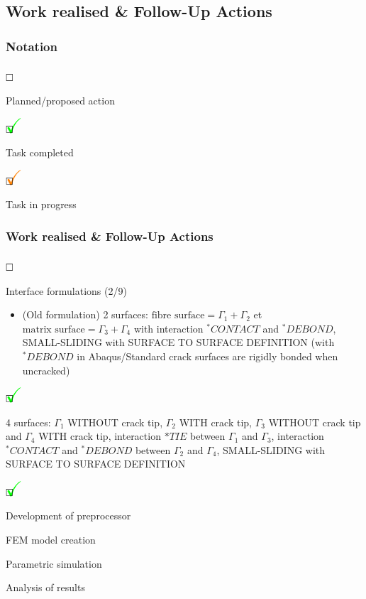 \documentclass[first,firstsupp,lastsupp,handout,last,hyperref,table]{ETHclass}
\begin{document}
\subsection{Work realised \& Follow-Up Actions}

\begin{frame}
\frametitle{Notation}
\vspace{-0.5cm}
\scriptsize
\begin{list}{$\text{\rlap{\textcolor{white}{\huge$\mathbf{\checkmark}$}}}\square$}{}  
\item Planned/proposed action
\end{list}
\begin{list}{$\text{\rlap{\textcolor{green}{\huge$\mathbf{\checkmark}$}}}\square$}{}
\item Task completed
\end{list}
\begin{list}{$\text{\rlap{\textcolor{orange}{\huge$\mathbf{\checkmark}$}}}\square$}{}  
\item Task in progress
\end{list}
\end{frame}

\begin{frame}
\frametitle{Work realised \& Follow-Up Actions}
\vspace{-0.5cm}
\scriptsize
\begin{list}{$\text{\rlap{\textcolor{white}{\huge$\mathbf{\checkmark}$}}}\square$}{}  
\item Interface formulations (2/9)
\begin{itemize}[label=]
\item (Old formulation) 2 surfaces: $\text{fibre surface}=\Gamma_{1}+\Gamma_{2}$ et $\text{matrix surface}=\Gamma_{3}+\Gamma_{4}$ with interaction $^{*}CONTACT$ and $^{*}DEBOND$, SMALL-SLIDING with SURFACE TO SURFACE DEFINITION (with $^{*}DEBOND$ in Abaqus/Standard crack surfaces are rigidly bonded when uncracked)
\end{itemize}
\begin{list}{$\text{\rlap{\textcolor{green}{\huge$\mathbf{\checkmark}$}}}\square$}{}  
\item 4 surfaces: $\Gamma_{1}$ WITHOUT crack tip, $\Gamma_{2}$ WITH crack tip, $\Gamma_{3}$ WITHOUT crack tip and $\Gamma_{4}$ WITH crack tip, interaction $*TIE$ between $\Gamma_{1}$ and $\Gamma_{3}$, interaction $^{*}CONTACT$ and $^{*}DEBOND$ between $\Gamma_{2}$ and $\Gamma_{4}$, SMALL-SLIDING with SURFACE TO SURFACE DEFINITION
\begin{list}{$\text{\rlap{\textcolor{green}{\huge$\mathbf{\checkmark}$}}}\square$}{}
\item Development of preprocessor
\item FEM model creation
\item Parametric simulation
\item Analysis of results
\end{list}
\end{list}
\end{list}
\end{frame}
\end{document}
